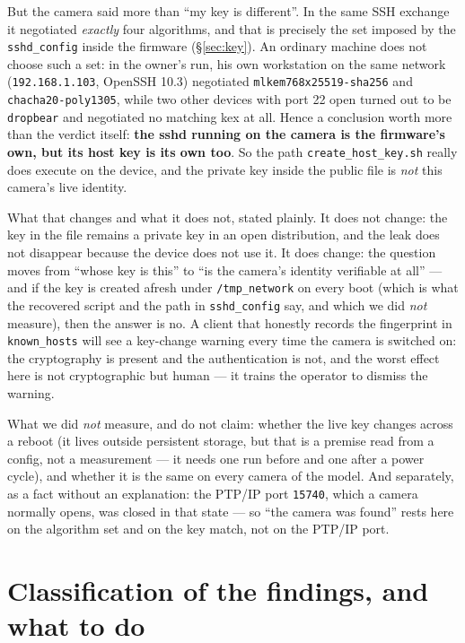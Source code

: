 \documentclass[12pt]{article}
\newcommand{\code}[1]{\texttt{\small #1}}
\newcommand{\lc}[1]{\texttt{\small #1}}
\begin{document}
But the camera said more than ``my key is different''. In the same SSH exchange it negotiated
\emph{exactly} four algorithms, and that is precisely the set imposed by the \code{sshd\_config}
inside the firmware (\S\ref{sec:key}). An ordinary machine does not choose such a set: in the
owner's run, his own workstation on the same network (\code{192.168.1.103}, OpenSSH 10.3)
negotiated \lc{mlkem768\allowbreak x25519-s\allowbreak ha256} and \code{chacha20-poly1305}, while two other devices
with port 22 open turned out to be \code{dropbear} and negotiated no matching kex at all. Hence
a conclusion worth more than the verdict itself: \textbf{the sshd running on the camera is the
firmware's own, but its host key is its own too}. So the path
\code{create\_host\_key.sh} really does execute on the device, and the private key inside the
public file is \emph{not} this camera's live identity.

What that changes and what it does not, stated plainly. It does not change: the key in the file
remains a private key in an open distribution, and the leak does not disappear because the
device does not use it. It does change: the question moves from ``whose key is this'' to ``is
the camera's identity verifiable at all'' --- and if the key is created afresh under
\code{/tmp\_network} on every boot (which is what the recovered script and the path in
\code{sshd\_config} say, and which we did \emph{not} measure), then the answer is no. A client
that honestly records the fingerprint
in \code{known\_hosts} will see a key-change warning every time the camera is switched on: the
cryptography is present and the authentication is not, and the worst effect here is not
cryptographic but human --- it trains the operator to dismiss the warning.

What we did \emph{not} measure, and do not claim: whether the live key changes across a reboot
(it lives outside persistent storage, but that is a premise read from a config, not a
measurement --- it needs one run before and one after a power cycle), and whether it is the
same on every camera of the model. And separately, as a fact without an explanation: the PTP/IP
port \code{15740}, which a camera normally opens, was closed in that state --- so ``the camera
was found'' rests here on the algorithm set and on the key match, not on the PTP/IP port.

\section{Classification of the findings, and what to do}
\label{sec:findings}
\end{document}
